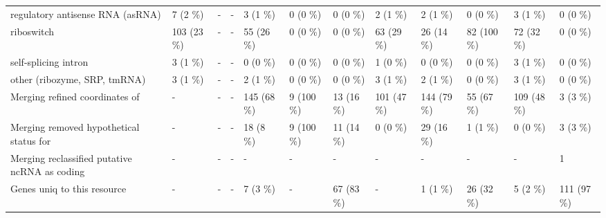 {\begin{tabular}{llllllllllll}
\hspace{1em}regulatory antisense RNA (asRNA) & 7 (2 \%) & - & - & 3 (1 \%) & 0 (0 \%) & 0 (0 \%) & 2 (1 \%) & 2 (1 \%) & 0 (0 \%) & 3 (1 \%) & 0 (0 \%)\\
\hspace{1em}riboswitch & 103 (23 \%) & - & - & 55 (26 \%) & 0 (0 \%) & 0 (0 \%) & 63 (29 \%) & 26 (14 \%) & 82 (100 \%) & 72 (32 \%) & 0 (0 \%)\\
\hspace{1em}self-splicing intron & 3 (1 \%) & - & - & 0 (0 \%) & 0 (0 \%) & 0 (0 \%) & 1 (0 \%) & 0 (0 \%) & 0 (0 \%) & 3 (1 \%) & 0 (0 \%)\\
\hspace{1em}other (ribozyme, SRP, tmRNA) & 3 (1 \%) & - & - & 2 (1 \%) & 0 (0 \%) & 0 (0 \%) & 3 (1 \%) & 2 (1 \%) & 0 (0 \%) & 3 (1 \%) & 0 (0 \%)\\
Merging refined coordinates of & - & - & - & 145 (68 \%) & 9 (100 \%) & 13 (16 \%) & 101 (47 \%) & 144 (79 \%) & 55 (67 \%) & 109 (48 \%) & 3 (3 \%)\\
Merging removed hypothetical status for & - & - & - & 18 (8 \%) & 9 (100 \%) & 11 (14 \%) & 0 (0 \%) & 29 (16 \%) & 1 (1 \%) & 0 (0 \%) & 3 (3 \%)\\
Merging reclassified putative ncRNA as coding & - & - & - & - & - & - & - & - & - & - & 1\\
Genes uniq to this resource & - & - & - & 7 (3 \%) & - & 67 (83 \%) & - & 1 (1 \%) & 26 (32 \%) & 5 (2 \%) & 111 (97 \%)\\
\bottomrule
\end{tabular}}
